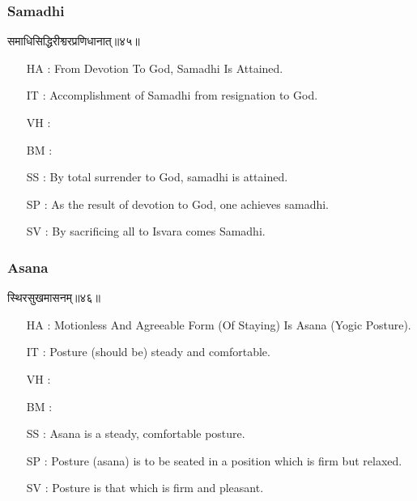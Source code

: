 \begin{frame}[fragile]\frametitle{Samadhi}
\begin{sanskrit}
समाधिसिद्धिरीश्वरप्रणिधानात्॥४५॥
\end{sanskrit}

	\begin{itemize}
	\item [HA]: From Devotion To God, Samadhi Is Attained.
	\item [IT]: Accomplishment of Samadhi from resignation to God.
	\item [VH]: 
	\item [BM]: 
	\item [SS]: By total surrender to God, samadhi is attained.
	\item [SP]: As the result of devotion to God, one achieves samadhi.
	\item [SV]: By sacrificing all to Isvara comes Samadhi. 
	\end{itemize}
\end{frame}


\begin{frame}[fragile]\frametitle{Asana}
\begin{sanskrit}
स्थिरसुखमासनम्॥४६॥
\end{sanskrit}

	\begin{itemize}
	\item [HA]: Motionless And Agreeable Form (Of Staying) Is Asana (Yogic Posture).
	\item [IT]: Posture (should be) steady and comfortable.
	\item [VH]: 
	\item [BM]: 
	\item [SS]: Asana is a steady, comfortable posture.
	\item [SP]: Posture (asana) is to be seated in a position which is firm but relaxed.
	\item [SV]: Posture is that which is firm and pleasant. 
	\end{itemize}
\end{frame}


